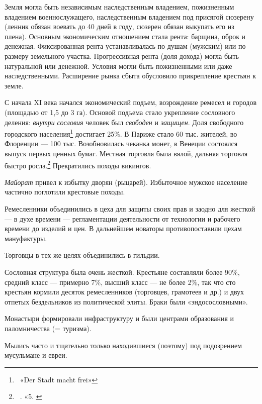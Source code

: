 Земля могла быть независимым наследственным владением, пожизненным владением военнослужащего, наследственным владением
под присягой сюзерену (ленник обязан воевать до 40 дней в году, сюзерен обязан выкупать его из плена). Основным
экономическим отношением стала рента: барщина, оброк и денежная. Фиксированная рента устанавливалась по душам (мужским)
или по размеру земельного участка. Прогрессивная рента (доля дохода) могла быть натуральной или денежной. Условия могли
быть пожизненными или даже наследственными. Расширение рынка сбыта обусловило прикрепление крестьян к земле.


С начала \foreignlanguage{english}{XI} века начался экономический подъем, возрождение ремесел и городов (площадью от 1,5
до 3 га). Основой подъема стало укрепление сословного деления: \textit{внутри} \textit{сословия} человек был
\textit{свободен} и \textit{защищен}. Доля свободного городского
населения\footnote{\foreignlanguage{english}{\textsf{\ }}\foreignlanguage{english}{«Der Stadt macht frei»}} достигает
25\%. В Париже стало 60 тыс. жителей, во Флоренции — 100 тыс. Возобновилась чеканка монет, в Венеции состоялся выпуск
первых ценных бумаг. Местная торговля была вялой, дальняя торговля быстро
росла.\footnote{\foreignlanguage{english}{\ }\foreignlanguage{english}{.
«}5\foreignlanguage{english}{. }} Прекратились походы
викингов.


\textit{Майорат} привел к избытку дворян (рыцарей). Избыточное мужское население частично поглотили крестовые походы.


Ремесленники объединились в цеха для защиты своих прав и заодно для жесткой — в духе времени — регламентации
деятельности от технологии и рабочего времени до изделий и цен. В дальнейшем новаторы противопоставили цехам
мануфактуры.


Торговцы в тех же целях объединились в гильдии.


Сословная структура была очень жесткой. Крестьяне составляли более 90\%, средний класс — примерно 7\%, высший класс — не
более 2\%, так что сто крестьян кормили десяток ремесленников (торговцев, грамотеев и др.) и двух отпетых бездельников
из политической элиты. Браки были «эндосословными».

Монастыри формировали инфраструктуру и были центрами образования и паломничества (= туризма).

Мылись часто и тщательно только находившиеся (поэтому) под подозрением мусульмане и евреи.

